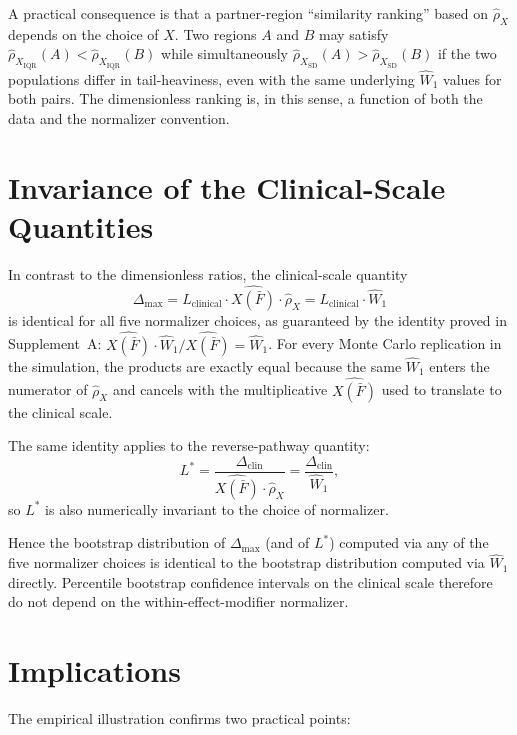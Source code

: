 \documentclass[11pt]{article}
\begin{document}
A practical consequence is that a partner-region ``similarity ranking'' based on $\hat{\rho}_X$ depends on the choice of $X$. Two regions $A$ and $B$ may satisfy $\hat{\rho}_{X_{\text{IQR}}}(A) < \hat{\rho}_{X_{\text{IQR}}}(B)$ while simultaneously $\hat{\rho}_{X_{\text{SD}}}(A) > \hat{\rho}_{X_{\text{SD}}}(B)$ if the two populations differ in tail-heaviness, even with the same underlying $\widehat{W}_1$ values for both pairs. The dimensionless ranking is, in this sense, a function of both the data and the normalizer convention.

\section{Invariance of the Clinical-Scale Quantities}\label{sec:supB_invariance}

In contrast to the dimensionless ratios, the clinical-scale quantity
\[
\Delta_{\max} = L_{\text{clinical}} \cdot \widehat{X(\bar{F})} \cdot \hat{\rho}_X = L_{\text{clinical}} \cdot \widehat{W}_1
\]
is identical for all five normalizer choices, as guaranteed by the identity proved in Supplement~A: $\widehat{X(\bar{F})} \cdot \widehat{W}_1 / \widehat{X(\bar{F})} = \widehat{W}_1$. For every Monte Carlo replication in the simulation, the products are exactly equal because the same $\widehat{W}_1$ enters the numerator of $\hat{\rho}_X$ and cancels with the multiplicative $\widehat{X(\bar{F})}$ used to translate to the clinical scale.

The same identity applies to the reverse-pathway quantity:
\[
L^* = \frac{\Delta_{\text{clin}}}{\widehat{X(\bar{F})} \cdot \hat{\rho}_X} = \frac{\Delta_{\text{clin}}}{\widehat{W}_1},
\]
so $L^*$ is also numerically invariant to the choice of normalizer.

Hence the bootstrap distribution of $\Delta_{\max}$ (and of $L^*$) computed via any of the five normalizer choices is identical to the bootstrap distribution computed via $\widehat{W}_1$ directly. Percentile bootstrap confidence intervals on the clinical scale therefore do not depend on the within-effect-modifier normalizer.

\section{Implications}\label{sec:supB_implications}

The empirical illustration confirms two practical points:
\end{document}
